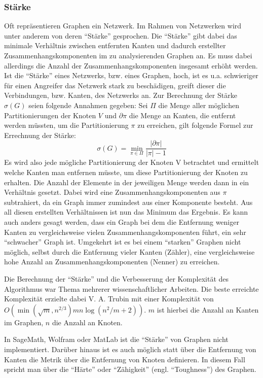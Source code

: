 \documentclass[a4paper,12pt,ngerman,chapterprefix=false,listof=totoc,bibliography=totoc]{scrreprt}
\begin{document}
\subsubsection*{Stärke}
{
Oft repräsentieren Graphen ein Netzwerk. Im Rahmen von Netzwerken wird unter anderem von deren "`Stärke"' gesprochen. Die "`Stärke"' gibt dabei das minimale Verhältnis zwischen entfernten Kanten und dadurch erstellter Zusammenhangskomponenten im zu analysierenden Graphen an. Es muss dabei allerdings die Anzahl der Zusammenhangskomponenten insgesamt erhöht werden. Ist die "`Stärke"' eines Netzwerks, bzw. eines Graphen, hoch, ist es u.a. schwieriger für einen Angreifer das Netzwerk stark zu beschädigen, greift dieser die Verbindungen, bzw. Kanten, des Netzwerks an. Zur Berechnung der Stärke \(\sigma(G)\) seien folgende Annahmen gegeben: Sei \(\Pi\) die Menge aller möglichen Partitionierungen der Knoten \(V\) und \(\partial\pi\) die Menge an Kanten, die entfernt werden müssten, um die Partitionierung \(\pi\) zu erreichen, gilt folgende Formel zur Errechnung der Stärke:
\[\sigma(G)=\min_{\pi\in\Pi}\frac{\vert\partial\pi\vert}{\vert\pi\vert -1}\]
Es wird also jede mögliche Partitionierung der Knoten V betrachtet und ermittelt welche Kanten man entfernen müsste, um diese Partitionierung der Knoten zu erhalten. Die Anzahl der Elemente in der jeweiligen Menge werden dann in ein Verhältnis gesetzt. Dabei wird eine Zusammenhangskomponenten aus \(\pi\) subtrahiert, da ein Graph immer zumindest aus einer Komponente besteht. Aus all diesen erstellten Verhältnissen ist nun das Minimum das Ergebnis. \cite{trubin_strenght_1993,cunningham_optimal_1985} Es kann auch anders gesagt werden, dass ein Graph bei dem die Entfernung weniger Kanten zu vergleichsweise vielen Zusammenhangskomponenten führt, ein sehr "`schwacher"' Graph ist. Umgekehrt ist es bei einem "`starken"' Graphen nicht möglich, selbst durch die Entfernung vieler Kanten (Zähler), eine vergleichsweise hohe Anzahl an Zusammenhangskomponenten (Nenner) zu erreichen.

Die Berechnung der "`Stärke"' und die Verbesserung der Komplexität des Algorithmus war Thema mehrerer wissenschaftlicher Arbeiten. Die beste erreichte Komplexität erzielte dabei V. A. Trubin mit einer Komplexität von \(O(\min(\sqrt{m},n^{2/3})mn\log(n^2/m+2))\). \(m\) ist hierbei die Anzahl an Kanten im Graphen, \(n\) die Anzahl an Knoten. \cite{trubin_strenght_1993}

In SageMath, Wolfram oder MatLab ist die "`Stärke"' von Graphen nicht implementiert. Darüber hinaus ist es auch möglich statt über die Entfernung von Kanten die Metrik über die Entfernung von Knoten definieren. In diesem Fall spricht man über die "`Härte"' oder "`Zähigkeit"' (engl. "`Toughness"') des Graphen. \cite{chvatal_tough_2006}
}
\end{document}
